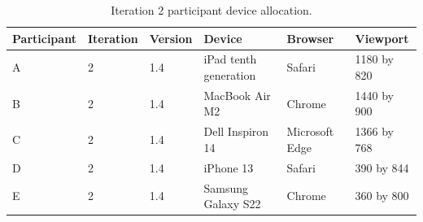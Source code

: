 \documentclass[11pt,a4paper]{article}
\begin{document}
\begin{table}[H]
    \centering
    \footnotesize
    \caption{Iteration 2 participant device allocation.}
    \label{tabiterationtwodevicesappendix}
    \begin{tabularx}{\textwidth}
        {@{}L{1.8cm}L{1.6cm}L{1.5cm}L{4.2cm}L{2.6cm}Y@{}}
        \toprule
        Participant & Iteration & Version & Device & Browser & Viewport\\
        \midrule
        A & 2 & 1.4 & iPad tenth generation & Safari & 1180 by 820\\
        B & 2 & 1.4 & MacBook Air M2 & Chrome & 1440 by 900\\
        C & 2 & 1.4 & Dell Inspiron 14 & Microsoft Edge & 1366 by 768\\
        D & 2 & 1.4 & iPhone 13 & Safari & 390 by 844\\
        E & 2 & 1.4 & Samsung Galaxy S22 & Chrome & 360 by 800\\
        \bottomrule
    \end{tabularx}
\end{table}
\end{document}
